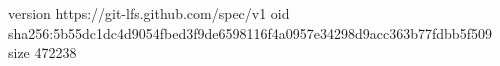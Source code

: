 version https://git-lfs.github.com/spec/v1
oid sha256:5b55dc1dc4d9054fbed3f9de6598116f4a0957e34298d9acc363b77fdbb5f509
size 472238
